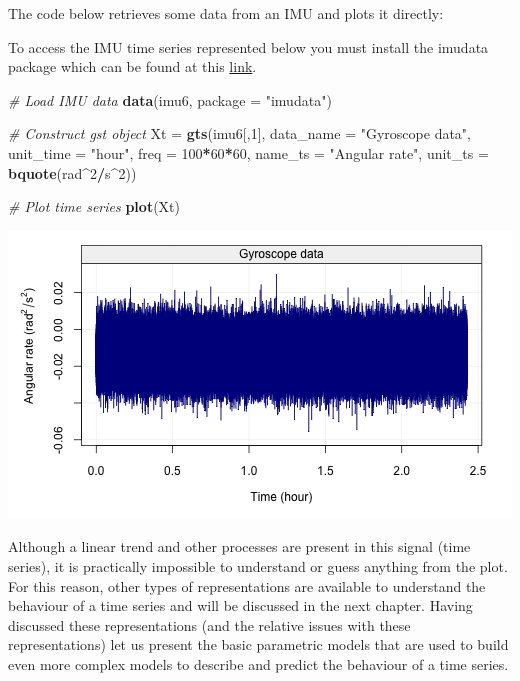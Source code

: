 \documentclass[]{book}
\newenvironment{Shaded}{\begin{snugshade}}{\end{snugshade}}
\newcommand{\CommentTok}[1]{\textcolor[rgb]{0.56,0.35,0.01}{\textit{#1}}}
\newcommand{\DataTypeTok}[1]{\textcolor[rgb]{0.13,0.29,0.53}{#1}}
\newcommand{\DecValTok}[1]{\textcolor[rgb]{0.00,0.00,0.81}{#1}}
\newcommand{\KeywordTok}[1]{\textcolor[rgb]{0.13,0.29,0.53}{\textbf{#1}}}
\newcommand{\NormalTok}[1]{#1}
\newcommand{\OperatorTok}[1]{\textcolor[rgb]{0.81,0.36,0.00}{\textbf{#1}}}
\newcommand{\StringTok}[1]{\textcolor[rgb]{0.31,0.60,0.02}{#1}}
\theoremstyle{definition}
\theoremstyle{definition}
\theoremstyle{definition}
\theoremstyle{remark}
\let\BeginKnitrBlock\begin \let\EndKnitrBlock\end
\begin{document}
The code below retrieves some data from an IMU and plots it directly:

\BeginKnitrBlock{rmdimportant}
To access the IMU time series represented below you must install the
imudata package which can be found at this
\href{https://github.com/SMAC-Group/imudata}{link}.
\EndKnitrBlock{rmdimportant}

\begin{Shaded}
\begin{Highlighting}[]
\CommentTok{# Load IMU data}
\KeywordTok{data}\NormalTok{(imu6, }\DataTypeTok{package =} \StringTok{"imudata"}\NormalTok{)}

\CommentTok{# Construct gst object}
\NormalTok{Xt =}\StringTok{ }\KeywordTok{gts}\NormalTok{(imu6[,}\DecValTok{1}\NormalTok{], }\DataTypeTok{data_name =} \StringTok{"Gyroscope data"}\NormalTok{, }\DataTypeTok{unit_time =} \StringTok{"hour"}\NormalTok{, }
         \DataTypeTok{freq =} \DecValTok{100}\OperatorTok{*}\DecValTok{60}\OperatorTok{*}\DecValTok{60}\NormalTok{, }\DataTypeTok{name_ts =} \StringTok{"Angular rate"}\NormalTok{, }
         \DataTypeTok{unit_ts =} \KeywordTok{bquote}\NormalTok{(rad}\OperatorTok{^}\DecValTok{2}\OperatorTok{/}\NormalTok{s}\OperatorTok{^}\DecValTok{2}\NormalTok{))}

\CommentTok{# Plot time series}
\KeywordTok{plot}\NormalTok{(Xt)}
\end{Highlighting}
\end{Shaded}

\begin{center}\includegraphics{ts_files/figure-latex/example_IMU-1} \end{center}

Although a linear trend and other processes are present in this signal
(time series), it is practically impossible to understand or guess
anything from the plot. For this reason, other types of representations
are available to understand the behaviour of a time series and will be
discussed in the next chapter. Having discussed these representations
(and the relative issues with these representations) let us present the
basic parametric models that are used to build even more complex models
to describe and predict the behaviour of a time series.
\end{document}

